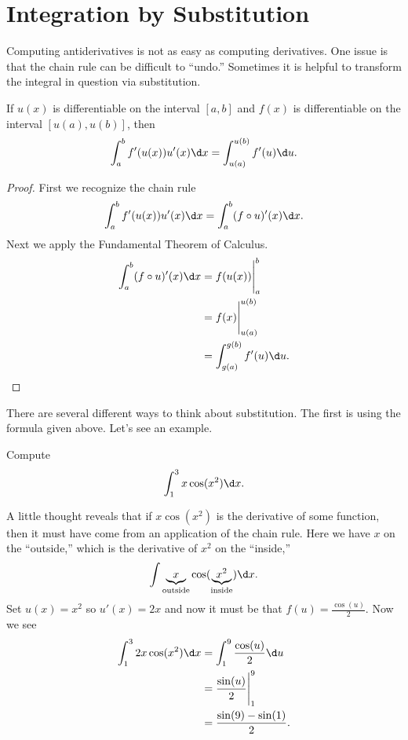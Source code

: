 \chapter{Integration by Substitution}

Computing antiderivatives is not as easy as computing derivatives. One
issue is that the chain rule can be difficult to ``undo.'' Sometimes 
it is helpful to transform the integral in question via substitution. 

\begin{mainTheorem} 
If $u(x)$ is differentiable on the interval $[a,b]$ and $f(x)$ is
differentiable on the interval $[u(a),u(b)]$, then
\[
\int_a^b f'(u(x)) u'(x) \d x =\int_{u(a)}^{u(b)} f'(u) \d u.
\]
\end{mainTheorem}
\begin{proof} First we recognize the chain rule
\[
\int_a^b f'(u(x)) u'(x) \d x = \int_a^b (f\circ u)'(x) \d x.
\]
Next we apply the Fundamental Theorem of Calculus. 
\begin{align*} 
\int_a^b (f\circ u)'(x) \d x &= f(u(x)) \Biggr|_a^b \\
&= f(x) \Biggr|_{u(a)}^{u(b)}\\ 
&= \int_{g(a)}^{g(b)} f'(u) \d u.
\end{align*}
\end{proof}


There are several different ways to think about substitution. The
first is using the formula given above. Let's see an example. 
\begin{example}
Compute
\[
\int_1^3 x\cos(x^2)\d x.
\]
\end{example}


\begin{solution}
A little thought reveals that if $x\cos(x^2)$ is the derivative of
some function, then it must have come from an application of the chain
rule. Here we have $x$ on the ``outside,'' which is the derivative of
$x^2$ on the ``inside,'' 
\[
\int \underbrace{x}_{\text{outside}}\cos(\underbrace{x^2}_{\text{inside}})\d x.
\]
Set $u(x) = x^2$ so $u'(x) = 2x$ and now it must be that $f(u) =
\frac{\cos(u)}{2}$. Now we see
\begin{align*}
\int_1^3 2x\cos(x^2)\d x &= \int_1^9 \frac{\cos(u)}{2}\d u\\
&= \frac{\sin(u)}{2} \Biggr|_1^9 \\
&= \frac{\sin(9) -\sin(1)}{2}.
\end{align*}
\end{solution}

